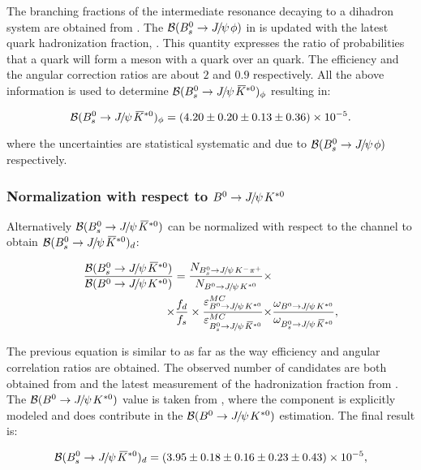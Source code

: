 \noindent The branching fractions of the intermediate resonance decaying to a dihadron system are obtained from \cite{PDG}.
The $\BRof\BsJpsiPhi$ in \cite{SheldonKK} is updated with the latest \bquark quark hadronization
fraction, \fdfs \cite{LHCb-CONF-2013-011}. This quantity expresses the ratio of probabilities that a \bquark quark will form a meson with a
\dquark quark over an \squark quark. The efficiency and the angular correction ratios are about $2$ and $0.9$ respectively.
All the above information is used to determine $\BRof{\BsJpsiKst}_\Pphi$ resulting in:

\begin{equation}
  \centering
\BRof\BsJpsiKst_{\Pphi} = (4.20 \pm 0.20 \pm 0.13 \pm 0.36) \times 10^{-5}.
\label{Br_JpsiPhi}
\end{equation}

\noindent where the uncertainties are statistical systematic and due to $\BRof\BsJpsiPhi$ respectively.

\subsubsection{Normalization with respect to $\BdJpsiKst$}
Alternatively $\BRof\BsJpsiKst$ can be normalized with respect to the \BdJpsiKst channel to obtain $\BRof{\BsJpsiKst}_\dquark$:

\begin{align}
  \centering
\frac{\BRof\BsJpsiKst}{\BRof\BdJpsiKst} = \frac{N_{\BsJpsiKpi}}{N_{\BdJpsiKst}} \times & \nonumber \\
                                   \times \fdfs
                                   \times \frac{\varepsilon_{\BdJpsiKst}^{MC}}{\varepsilon_{\BsJpsiKst}^{MC}}
                                   \times &\frac{\omega_{\BdJpsiKst}}{\omega_{\BsJpsiKst}},
\label{norm_jpsiKst}
\end{align}

\noindent The previous equation is similar to  as far as the way efficiency and angular correlation ratios are obtained.
The observed number of candidates are both obtained from  and the latest measurement of the hadronization
fraction from \cite{LHCb-CONF-2013-011}. The $\BRof\BdJpsiKst$ value is taken from \cite{Abe:2002haa}, where the \swave component
is explicitly modeled and does contribute in the $\BRof\BdJpsiKst$ estimation. The final result is:

\begin{equation}
  \centering
\BRof\BsJpsiKst_\dquark = (3.95 \pm 0.18 \pm 0.16 \pm 0.23 \pm 0.43 )\times 10^{-5},
\label{Br_JpsiKst}
\end{equation}

